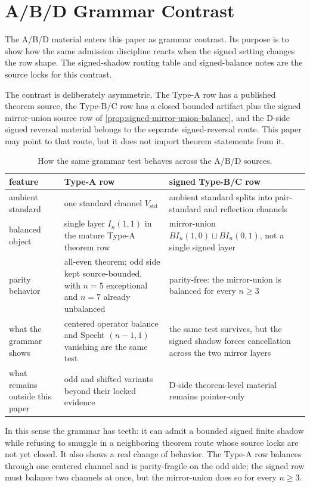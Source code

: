 \section{A/B/D Grammar Contrast}

The A/B/D material enters this paper as grammar contrast.  Its purpose is to show how the same admission discipline reacts when the signed setting changes the row shape.  The signed-shadow routing table and signed-balance notes are the source locks for this contrast.

The contrast is deliberately asymmetric.  The Type-A row has a published theorem source, the Type-B/C row has a closed bounded artifact plus the signed mirror-union source row of \cref{prop:signed-mirror-union-balance}, and the D-side signed reversal material belongs to the separate signed-reversal route.  This paper may point to that route, but it does not import theorem statements from it.

\begin{table}[ht]
\centering
\caption{How the same grammar test behaves across the A/B/D sources.}
\label{tab:abd-contrast}
\begin{tabular}{@{}L{0.22\textwidth}L{0.32\textwidth}L{0.36\textwidth}@{}}
\toprule
feature & Type-A row & signed Type-B/C row \\
\midrule
ambient standard & one standard channel \(V_{\mathrm{std}}\) & ambient standard splits into pair-standard and reflection channels \\
balanced object & single layer \(I_n(1,1)\) in the mature Type-A theorem row & mirror-union \(BI_n(1,0)\sqcup BI_n(0,1)\), not a single signed layer \\
parity behavior & all-even theorem; odd side kept source-bounded, with \(n=5\) exceptional and \(n=7\) already unbalanced & parity-free: the mirror-union is balanced for every \(n\geq3\) \\
what the grammar shows & centered operator balance and Specht \((n-1,1)\) vanishing are the same test & the same test survives, but the signed shadow forces cancellation across the two mirror layers \\
what remains outside this paper & odd and shifted variants beyond their locked evidence & D-side theorem-level material remains pointer-only \\
\bottomrule
\end{tabular}
\end{table}

In this sense the grammar has teeth: it can admit a bounded signed finite shadow while refusing to smuggle in a neighboring theorem route whose source locks are not yet closed.  It also shows a real change of behavior.  The Type-A row balances through one centered channel and is parity-fragile on the odd side; the signed row must balance two channels at once, but the mirror-union does so for every \(n\geq3\).